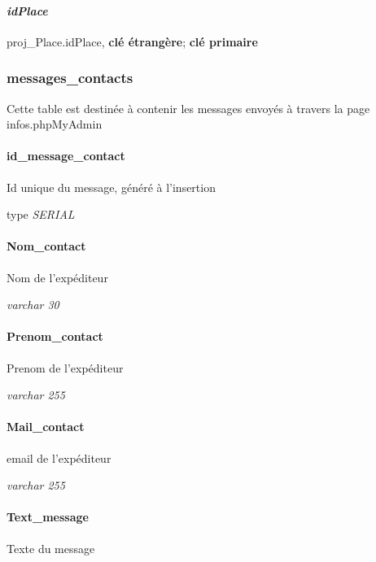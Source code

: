 \paragraph{\texorpdfstring{\textbf{\emph{idPlace}}}{idPlace}}\label{idplace-1}

proj\_Place.idPlace, \textbf{clé étrangère}; \textbf{clé primaire}

\subsubsection{messages\_contacts}\label{messagesux5fcontacts}

Cette table est destinée à contenir les messages envoyés à travers la
page infos.phpMyAdmin

\paragraph{id\_message\_contact}\label{idux5fmessageux5fcontact}

Id unique du message, généré à l'insertion

type \emph{SERIAL}

\paragraph{Nom\_contact}\label{nomux5fcontact}

Nom de l'expéditeur

\emph{varchar 30}

\paragraph{Prenom\_contact}\label{prenomux5fcontact}

Prenom de l'expéditeur

\emph{varchar 255}

\paragraph{Mail\_contact}\label{mailux5fcontact}

email de l'expéditeur

\emph{varchar 255}

\paragraph{Text\_message}\label{textux5fmessage}

Texte du message


